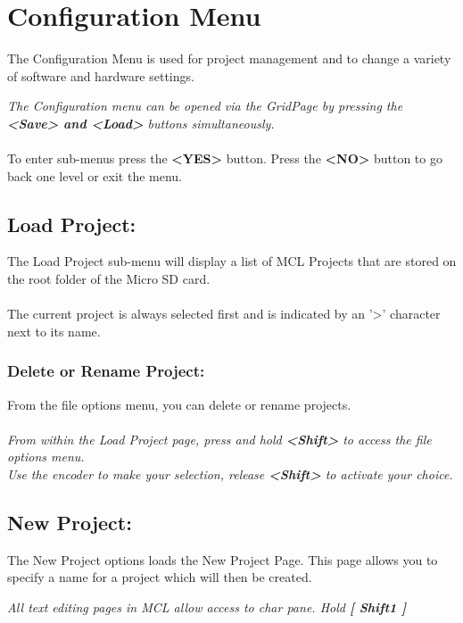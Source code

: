 \chapter{Configuration Menu}
The Configuration Menu is used for project management and to change a variety of software and hardware settings.


\textit{The Configuration menu can be opened via the GridPage by pressing the \textbf{<Save> and <Load>} buttons simultaneously.}\\\\
To enter sub-menus press the \textbf{<YES>} button. Press the \textbf{<NO>} button to go back one level or exit the menu.
\section{Load Project:}
The Load Project sub-menu will display a list of MCL Projects that are stored on the root folder of the Micro SD card.\\\\
The current project is always selected first and is indicated by an '>' character next to its name.

\subsection{Delete or Rename Project:}
From the file options menu, you can delete or rename projects.\\\\
\textit{From within the Load Project page, press and hold \textbf{<Shift>} to access the file options menu.\\
Use the encoder to make your selection, release \textbf{<Shift>} to activate your choice.}

\newpage
\section{New Project:}
The New Project options loads the New Project Page. This page allows you to specify a name for a project which will then be created.\\

\textit{All text editing pages in MCL allow access to char pane. Hold \textbf{[ Shift1 ]}}

